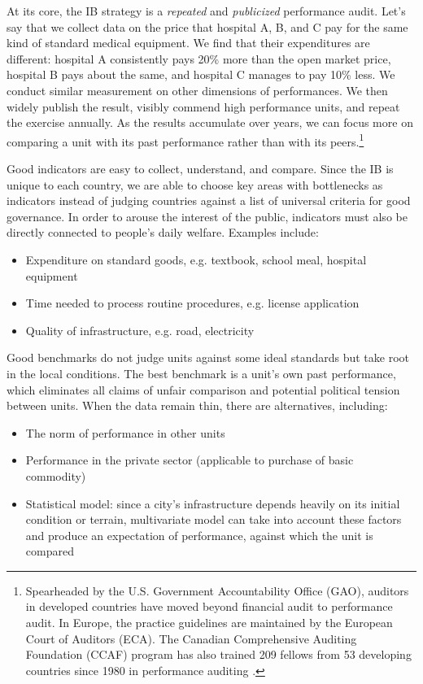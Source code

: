 \documentclass[12pt]{article}
\begin{document}
At its core, the IB strategy is a \textit{repeated} and \textit{publicized} performance audit. Let's say that we collect data on the price that hospital A, B, and C pay for the same kind of standard medical equipment. We find that their expenditures are different: hospital A consistently pays 20\% more than the open market price, hospital B pays about the same, and hospital C manages to pay 10\% less. We conduct similar measurement on other dimensions of performances. We then widely publish the result, visibly commend high performance units, and repeat the exercise annually. As the results accumulate over years, we can focus more on comparing a unit with its past performance rather than with its peers.\footnote{Spearheaded by the U.S. Government Accountability Office (GAO), auditors in developed countries have moved beyond financial audit to performance audit. In Europe, the practice guidelines are maintained by the European Court of Auditors (ECA). The Canadian Comprehensive Auditing Foundation (CCAF) program has also trained 209 fellows from 53 developing countries since 1980 in performance auditing \citep{CPB2010}.}

Good indicators are easy to collect, understand, and compare. Since the IB is unique to each country, we are able to choose key areas with bottlenecks as indicators instead of judging countries against a list of universal criteria for good governance. In order to arouse the interest of the public, indicators must also be directly connected to people's daily welfare. Examples include:
\begin{itemize}[noitemsep]
\item{Expenditure on standard goods, e.g. textbook, school meal, hospital equipment}
\item{Time needed to process routine procedures, e.g. license application}
\item{Quality of infrastructure, e.g. road, electricity}
\end{itemize}

Good benchmarks do not judge units against some ideal standards but take root in the local conditions. The best benchmark is a unit's own past performance, which eliminates all claims of unfair comparison and potential political tension between units. When the data remain thin, there are alternatives, including:
\begin{itemize}[noitemsep]
\item{The norm of performance in other units}
\item{Performance in the private sector (applicable to purchase of basic commodity)}
\item{Statistical model: since a city's infrastructure depends heavily on its initial condition or terrain, multivariate model can take into account these factors and produce an expectation of performance, against which the unit is compared}
\end{itemize}
\end{document}
